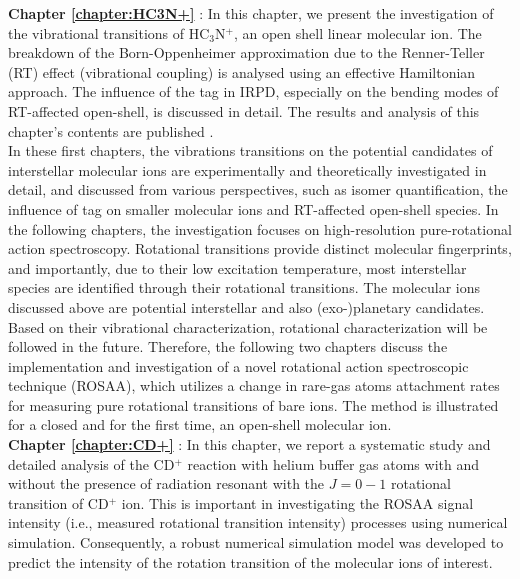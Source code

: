 \textbf{Chapter \ref{chapter:HC3N+}} \emph{}: 
In this chapter, we present the investigation of the vibrational transitions of HC$_3$N$^+$, an open shell linear 
molecular ion. The breakdown of the Born-Oppenheimer approximation due to the Renner-Teller (RT) effect (vibrational 
coupling) is analysed using an effective Hamiltonian approach. The influence of the tag in IRPD, especially on the 
bending modes of RT-affected open-shell, is discussed in detail. The results and analysis of this chapter's contents 
are published \cite{steenbakkers_vibrational_2023}.\\

In these first chapters, the vibrations transitions on the potential candidates of interstellar molecular ions are 
experimentally and theoretically investigated in detail, and discussed from various perspectives, such as isomer 
quantification, the influence of tag on smaller molecular ions and RT-affected open-shell species. In the following 
chapters, the investigation focuses on high-resolution pure-rotational action spectroscopy. Rotational transitions 
provide distinct molecular fingerprints, and importantly, due to their low excitation temperature, most interstellar 
species are identified through their rotational transitions. The molecular ions discussed above are potential 
interstellar and also (exo-)planetary candidates. Based on their vibrational characterization, rotational 
characterization will be followed in the future. Therefore, the following two chapters discuss the implementation and 
investigation of a novel rotational action spectroscopic technique (ROSAA), which utilizes a change in rare-gas atoms 
attachment rates for measuring pure rotational transitions of bare ions. The method is illustrated for a closed and for 
the first time, an open-shell molecular ion. \\

\textbf{Chapter \ref{chapter:CD+}} \emph{}: In this chapter, we report a systematic study and detailed analysis of the CD$^+$ reaction with helium buffer gas atoms with and without the presence of radiation resonant with the $J=0-1$ rotational transition of CD$^+$ ion. This is important in investigating the ROSAA signal intensity (i.e., measured rotational transition intensity) processes using numerical simulation. Consequently, a robust numerical simulation model was developed to predict the intensity of the rotation transition of the molecular ions of interest.\\

